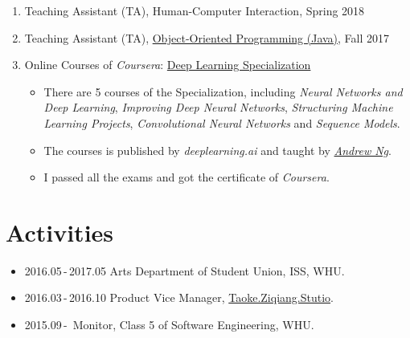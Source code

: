 \documentclass[letterpaper]{twentysecondcv} %
\begin{document}
\begin{enumerate}
	\item Teaching Assistant (TA), Human-Computer Interaction, Spring 2018
	\item Teaching Assistant (TA), \href{http://www.javatree.cn/}{Object-Oriented Programming (Java)}, Fall 2017
	\item Online Courses of \emph{Coursera}: \href{https://www.coursera.org/specializations/deep-learning}{Deep Learning Specialization}
		\begin{itemize}
			\item There are 5 courses of the Specialization, including
			\emph{Neural Networks and Deep Learning}, 
			\emph{Improving Deep Neural Networks}, 
			\emph{Structuring Machine Learning Projects}, 
			\emph{Convolutional Neural Networks} and 
			\emph{Sequence Models}.
			\item The courses is published by \emph{deeplearning.ai} and taught by \href{https://www.coursera.org/instructor/andrewng}{\emph{Andrew Ng}}.
			\item I passed all the exams and got the certificate of \emph{Coursera}.
		\end{itemize}
\end{enumerate}


\section{Activities}

\begin{itemize}
	\item 2016.05\,-\,2017.05 \qquad Arts Department of Student Union, ISS, WHU.
	\item 2016.03\,-\,2016.10 \qquad Product Vice Manager, \href{https://taoke.ziqiang.net.cn/}{Taoke.Ziqiang.Stutio}.
	\item 2015.09\,-\, \qquad \qquad \qquad Monitor, Class 5 of Software Engineering, WHU.
\end{itemize}

\newpage %
\makeprofile %
\end{document}
